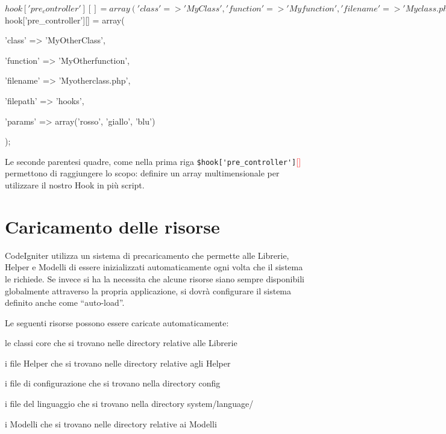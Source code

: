 \begin{code}
$hook['pre_controller'][] = array(

	'class'    => 'MyClass',

	'function' => 'Myfunction',

	'filename' => 'Myclass.php',

	'filepath' => 'hooks',

	'params'   => array('birra', 'vino', 'patatine')

	);

$hook['pre_controller'][] = array(

	'class'    => 'MyOtherClass',

	'function' => 'MyOtherfunction',

	'filename' => 'Myotherclass.php',

	'filepath' => 'hooks',

	'params'   => array('rosso', 'giallo', 'blu')

	);
\end{code}


Le seconde parentesi quadre, come nella prima riga \verb|$hook['pre_controller']|\textcolor{red}{[]} permettono di raggiungere lo scopo: definire un array multimensionale per utilizzare il nostro Hook in più script.

\section{Caricamento delle risorse}

CodeIgniter utilizza un sistema di precaricamento che permette alle Librerie, Helper e Modelli di essere inizializzati automaticamente ogni volta che il sistema le richiede. Se invece si ha la necessita che alcune risorse siano sempre disponibili globalmente attraverso la propria applicazione, si dovrà configurare il sistema definito anche come ``auto-load''.

Le seguenti risorse possono essere caricate automaticamente:

\begin{code}
\item le classi core che si trovano nelle directory relative alle Librerie
\item i file Helper che si trovano nelle directory relative agli Helper
\item i file di configurazione che si trovano nella directory config
\item i file del linguaggio che si trovano nella directory system/language/
\item i Modelli che si trovano nelle  directory relative ai Modelli
\end{code}


